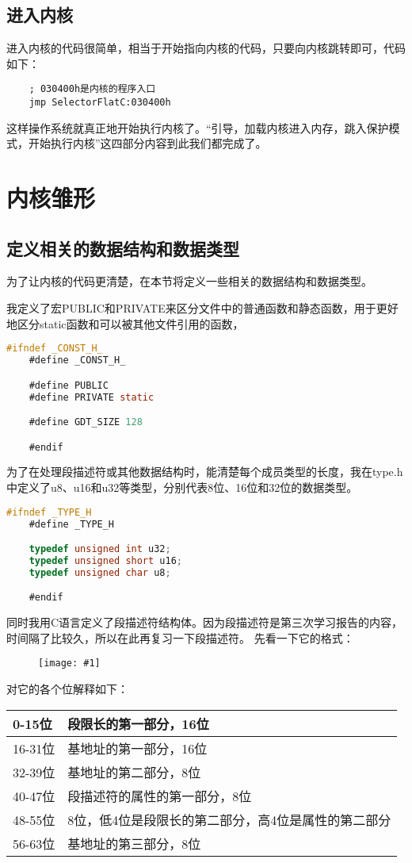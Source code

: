 \documentclass[a4paper,left=2.5cm,right=2.5cm,11pt]{article}
\newcommand{\fic}[1]{\begin{figure}[H]
		\center
		\texttt{[image: \#1]}
	\end{figure}}
\newcommand{\interval}{\vspace{0.5em}}
\begin{document}
\subsection{进入内核}
	进入内核的代码很简单，相当于开始指向内核的代码，只要向内核跳转即可，代码如下：
	\begin{lstlisting}
	; 030400h是内核的程序入口
	jmp SelectorFlatC:030400h
	\end{lstlisting}

	这样操作系统就真正地开始执行内核了。“引导，加载内核进入内存，跳入保护模式，开始执行内核”这四部分内容到此我们都完成了。

\clearpage

\section{内核雏形}
\subsection{定义相关的数据结构和数据类型}
	为了让内核的代码更清楚，在本节将定义一些相关的数据结构和数据类型。\par
	我定义了宏PUBLIC和PRIVATE来区分文件中的普通函数和静态函数，用于更好地区分static函数和可以被其他文件引用的函数，

	\begin{lstlisting}[language = C]
	#ifndef _CONST_H_
	#define _CONST_H_

	#define PUBLIC
	#define PRIVATE static

	#define GDT_SIZE 128

	#endif
	\end{lstlisting}

	为了在处理段描述符或其他数据结构时，能清楚每个成员类型的长度，我在type.h中定义了u8、u16和u32等类型，分别代表8位、16位和32位的数据类型。

	\begin{lstlisting}[language = C]
	#ifndef _TYPE_H
	#define _TYPE_H

	typedef unsigned int u32;
	typedef unsigned short u16;
	typedef unsigned char u8;

	#endif
	\end{lstlisting}

	同时我用C语言定义了段描述符结构体。因为段描述符是第三次学习报告的内容，时间隔了比较久，所以在此再复习一下段描述符。
	先看一下它的格式：
	\fic{2.png}

	对它的各个位解释如下：
	\interval
	\begin{longtable}{p{1.5cm}p{6cm}}
	\hline
	0-15位 & 段限长的第一部分，16位\\
	\hline
	16-31位 & 基地址的第一部分，16位\\
	\hline
	32-39位 & 基地址的第二部分，8位\\
	\hline
	40-47位 & 段描述符的属性的第一部分，8位\\
	\hline
	48-55位 & 8位，低4位是段限长的第二部分，高4位是属性的第二部分\\
	\hline
	56-63位 & 基地址的第三部分，8位\\
	\hline
	\end{longtable}
	\interval
\end{document}
